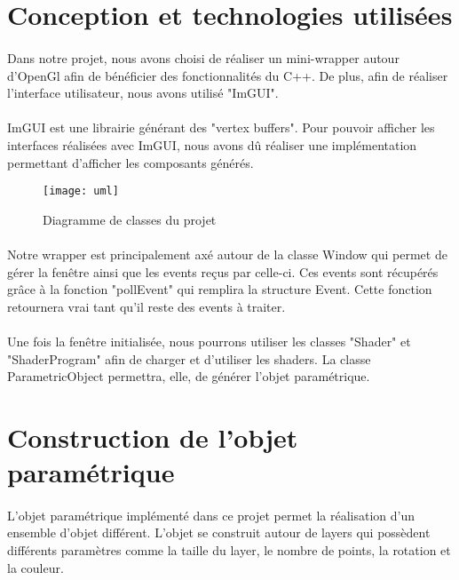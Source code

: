 \documentclass[article, backcover, french, nodocumentinfo]{upmethodology-document}
\begin{document}
	\section{Conception et technologies utilisées}
		\paragraph*{}
			Dans notre projet, nous avons choisi de réaliser un mini-wrapper autour d'OpenGl afin de bénéficier des fonctionnalités du C++.
			De plus, afin de réaliser l'interface utilisateur, nous avons utilisé "ImGUI".
		\paragraph*{}
			ImGUI est une librairie générant des "vertex buffers".
			Pour pouvoir afficher les interfaces réalisées avec ImGUI, nous avons dû réaliser une implémentation permettant d'afficher les composants générés.

			\begin{figure}[H]
				\centering%
				\texttt{[image: uml]}
				\caption{Diagramme de classes du projet}
				\label{fig:uml}
			\end{figure}

		\paragraph*{}
			Notre wrapper est principalement axé autour de la classe Window qui permet de gérer la fenêtre ainsi que les events reçus par celle-ci.
			Ces events sont récupérés grâce à la fonction "pollEvent" qui remplira la structure Event. Cette fonction retournera vrai tant qu'il reste des events à traiter.
		\paragraph*{}
			Une fois la fenêtre initialisée, nous pourrons utiliser les classes "Shader" et "ShaderProgram" afin de charger et d'utiliser les shaders.
			La classe ParametricObject permettra, elle, de générer l'objet paramétrique.

	\section{Construction de l'objet paramétrique}
	\paragraph{} L'objet paramétrique implémenté dans ce projet permet la réalisation d'un ensemble d'objet différent. L'objet se construit autour de layers qui possèdent différents paramètres comme la taille du layer, le nombre de points, la rotation et la couleur.
\end{document}
